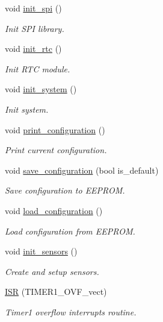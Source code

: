 \begin{DoxyCompactItemize}
void \hyperlink{i2c-th_8ino_a8eb9780a3438ec02c70314744f91f3c7}{init\+\_\+spi} ()
\begin{DoxyCompactList}\small\item\em Init S\+PI library. \end{DoxyCompactList}\item 
void \hyperlink{i2c-th_8ino_ab985cc69f5f573113405b4f118c96d33}{init\+\_\+rtc} ()
\begin{DoxyCompactList}\small\item\em Init R\+TC module. \end{DoxyCompactList}\item 
void \hyperlink{i2c-th_8ino_afceb890a6ab9be73cc5481369538c705}{init\+\_\+system} ()
\begin{DoxyCompactList}\small\item\em Init system. \end{DoxyCompactList}\item 
void \hyperlink{i2c-th_8ino_a65b2dadc0411e43874ec8ed7f73bc62a}{print\+\_\+configuration} ()
\begin{DoxyCompactList}\small\item\em Print current configuration. \end{DoxyCompactList}\item 
void \hyperlink{i2c-th_8ino_afa979a8cb238fe81bf20654dfd6096ef}{save\+\_\+configuration} (bool is\+\_\+default)
\begin{DoxyCompactList}\small\item\em Save configuration to E\+E\+P\+R\+OM. \end{DoxyCompactList}\item 
void \hyperlink{i2c-th_8ino_a32a64a2800c724fb28e10636f2ec20b9}{load\+\_\+configuration} ()
\begin{DoxyCompactList}\small\item\em Load configuration from E\+E\+P\+R\+OM. \end{DoxyCompactList}\item 
void \hyperlink{i2c-th_8ino_ac74850003fab6eb3269bfe043d0f939c}{init\+\_\+sensors} ()
\begin{DoxyCompactList}\small\item\em Create and setup sensors. \end{DoxyCompactList}\item 
\hyperlink{i2c-th_8ino_ab16889ae984b9b798989a0d239283cac}{I\+SR} (T\+I\+M\+E\+R1\+\_\+\+O\+V\+F\+\_\+vect)
\begin{DoxyCompactList}\small\item\em Timer1 overflow interrupts routine. \end{DoxyCompactList}\item 

\end{DoxyCompactItemize}
